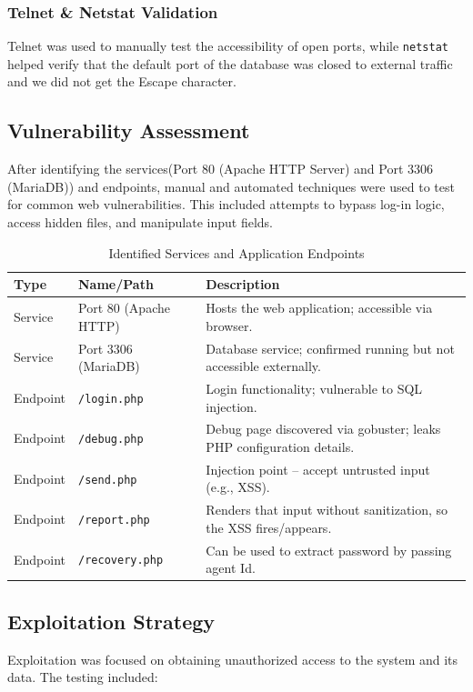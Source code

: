 \documentclass[12pt]{article}
\begin{document}
\subsubsection{Telnet \& Netstat Validation}
Telnet was used to manually test the accessibility of open ports, while \texttt{netstat} helped verify that the default port of the database was closed to external traffic and we did not get the Escape character.

\subsection{Vulnerability Assessment}
After identifying the services(Port 80 (Apache HTTP Server) and Port 3306 (MariaDB)) and endpoints, manual and automated techniques were used to test for common web vulnerabilities. This included attempts to bypass log-in logic, access hidden files, and manipulate input fields.

\begin{table}[h!]
\centering
\begin{tabular}{|p{3cm}|p{4cm}|p{7cm}|}
\hline
\textbf{Type} & \textbf{Name/Path} & \textbf{Description} \\
\hline
Service & Port 80 (Apache HTTP) & Hosts the web application; accessible via browser. \\
\hline
Service & Port 3306 (MariaDB) & Database service; confirmed running but not accessible externally. \\
\hline
Endpoint & \texttt{/login.php} & Login functionality; vulnerable to SQL injection. \\
\hline
Endpoint & \texttt{/debug.php} & Debug page discovered via gobuster; leaks PHP configuration details. \\
\hline
Endpoint & \texttt{/send.php} & Injection point – accept untrusted input (e.g., XSS). \\
\hline
\hline
Endpoint & \texttt{/report.php} & Renders that input without sanitization, so the XSS fires/appears. \\
\hline
Endpoint & \texttt{/recovery.php} & Can be used to extract password by passing agent Id. \\
\hline
\end{tabular}
\caption{Identified Services and Application Endpoints}
\end{table}


\subsection{Exploitation Strategy}
Exploitation was focused on obtaining unauthorized access to the system and its data. The testing included:
\end{document}
